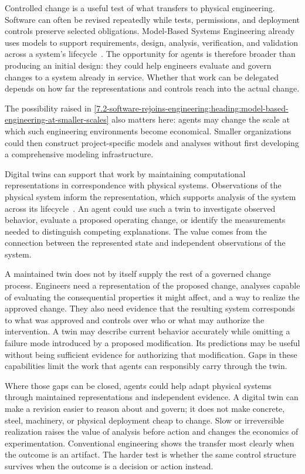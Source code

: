 Controlled change is a useful test of what transfers to physical engineering. Software can often be revised repeatedly while tests, permissions, and deployment controls preserve selected obligations. Model-Based Systems Engineering already uses models to support requirements, design, analysis, verification, and validation across a system's lifecycle~\citep{incose2023handbook}. The opportunity for agents is therefore broader than producing an initial design: they could help engineers evaluate and govern changes to a system already in service. Whether that work can be delegated depends on how far the representations and controls reach into the actual change.

The possibility raised in \autoref{7.2-software-rejoins-engineering:heading:model-based-engineering-at-smaller-scales} also matters here: agents may change the scale at which such engineering environments become economical. Smaller organizations could then construct project-specific models and analyses without first developing a comprehensive modeling infrastructure.

Digital twins can support that work by maintaining computational representations in correspondence with physical systems. Observations of the physical system inform the representation, which supports analysis of the system across its lifecycle~\citep{grieves2017digitaltwin}. An agent could use such a twin to investigate observed behavior, evaluate a proposed operating change, or identify the measurements needed to distinguish competing explanations. The value comes from the connection between the represented state and independent observations of the system.

A maintained twin does not by itself supply the rest of a governed change process. Engineers need a representation of the proposed change, analyses capable of evaluating the consequential properties it might affect, and a way to realize the approved change. They also need evidence that the resulting system corresponds to what was approved and controls over who or what may authorize the intervention. A twin may describe current behavior accurately while omitting a failure mode introduced by a proposed modification. Its predictions may be useful without being sufficient evidence for authorizing that modification. Gaps in these capabilities limit the work that agents can responsibly carry through the twin.

Where those gaps can be closed, agents could help adapt physical systems through maintained representations and independent evidence. A digital twin can make a revision easier to reason about and govern; it does not make concrete, steel, machinery, or physical deployment cheap to change. Slow or irreversible realization raises the value of analysis before action and changes the economics of experimentation. Conventional engineering shows the transfer most clearly when the outcome is an artifact. The harder test is whether the same control structure survives when the outcome is a decision or action instead.

